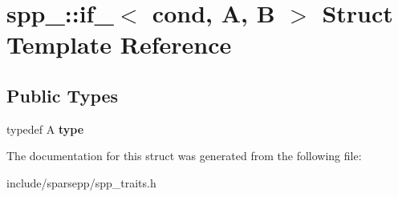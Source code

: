 \hypertarget{structspp___1_1if__}{}\section{spp\+\_\+\+:\+:if\+\_\+$<$ cond, A, B $>$ Struct Template Reference}
\label{structspp___1_1if__}
\subsection*{Public Types}
\begin{DoxyCompactItemize}
\item 
typedef A {\bfseries type}\hypertarget{structspp___1_1if___a65a0d930952070f75492999853ff6db1}{}\label{structspp___1_1if___a65a0d930952070f75492999853ff6db1}

\end{DoxyCompactItemize}


The documentation for this struct was generated from the following file\+:\begin{DoxyCompactItemize}
\item 
include/sparsepp/spp\+\_\+traits.\+h\end{DoxyCompactItemize}

